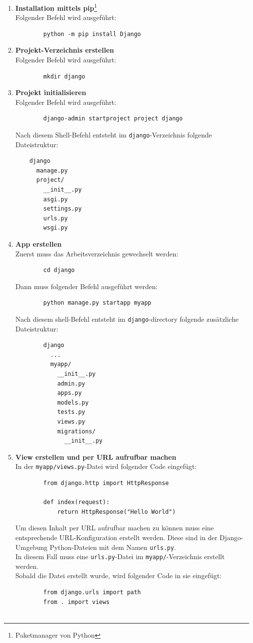\documentclass[letterpaper,11pt,leqno]{article}
\begin{document}
\begin{enumerate}
	\item\textbf{Installation mittels pip}\footnote{Paketmanager von Python}\\Folgender Befehl wird
	ausgeführt:
	\begin{verbatim}
		python -m pip install Django
	\end{verbatim}
	\item\textbf{Projekt-Verzeichnis erstellen}\\Folgender Befehl wird ausgeführt:
	\begin{verbatim}
		mkdir django
	\end{verbatim}
	\item\textbf{Projekt initialisieren}\\Folgender Befehl wird ausgeführt:
	\begin{verbatim}
		django-admin startproject project django
	\end{verbatim}
	Nach diesem Shell-Befehl entsteht im \verb|django|-Verzeichnis folgende Dateistruktur:
	\begin{verbatim}
	django
	  manage.py
	  project/
	    __init__.py
	    asgi.py
	    settings.py
	    urls.py
	    wsgi.py
	\end{verbatim}
	\item\textbf{App erstellen}\\Zuerst muss das Arbeitsverzeichnis gewechselt werden:
	\begin{verbatim}
		cd django
	\end{verbatim}
	Dann muss folgender Befehl ausgeführt werden:
	\begin{verbatim}
		python manage.py startapp myapp
	\end{verbatim}
	Nach diesem shell-Befehl entsteht im \verb|django|-directory folgende zusätzliche\\
	Dateistruktur:
	\begin{verbatim}
		django
		  ...
		  myapp/
		    __init__.py
		    admin.py
		    apps.py
		    models.py
		    tests.py
		    views.py
		    migrations/
		      __init__.py
	\end{verbatim}
	\item\textbf{View erstellen und per URL aufrufbar machen}\\In der \verb|myapp/views.py|-Datei wird folgender Code eingefügt:
	\begin{verbatim}
		from django.http import HttpResponse

		def index(request):
    		return HttpResponse("Hello World")
	\end{verbatim}
	\clearpage
	Um diesen Inhalt per URL aufrufbar machen zu können muss eine entsprechende URL-Konfiguration erstellt werden. Diese sind in
	der Django-Umgebung Python-Dateien mit dem Namen \verb|urls.py|.\\In diesem Fall muss eine \verb|urls.py|-Datei im
	\verb|myapp/|-Verzeichnis erstellt werden.\\Sobald die Datei erstellt wurde, wird folgender Code in sie eingefügt:
	\begin{verbatim}
		from django.urls import path
		from . import views


\end{verbatim}
\end{enumerate}
\end{document}
